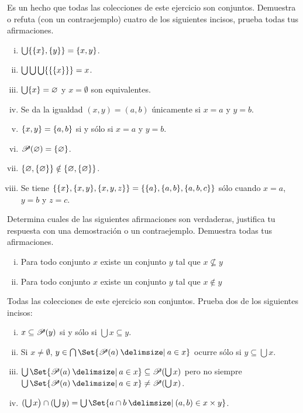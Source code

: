 \begin{exercise}
  Es un hecho que todas las colecciones de este ejercicio son conjuntos. Demuestra o refuta (con un contraejemplo) cuatro de los siguientes incisos, prueba todas tus afirmaciones.
  \begin{multicols}{2}
      \begin{enumerate}[i)]
          \item \( \bigcup \{\{x\},\{y\}\}=\{x,y\} \).
          \item \( \bigcup\bigcup\bigcup\{\{\{x\}\}\} = x \).
          \item \( \bigcup \{x\}=\varnothing \) y $x=\emptyset$ son equivalentes.
          \item Se da la igualdad \( (x,y)=(a,b) \) únicamente si \(x=a\) y \(y=b\).
          \item \( \{x,y\}=\{a,b\} \) si y sólo si $x=a$ y $y=b$.
          \item \( \mathscr{P}(\varnothing)=\{\varnothing\} \).
          \item \( \{\varnothing,\{\varnothing\}\} \notin \{\varnothing,\{\varnothing\}\} \).
          \item Se tiene \( \{\{x\},\{x,y\},\{x,y,z\}\} = \{\{a\},\{a,b\},\{a,b,c\}\} \) sólo cuando \(x=a\), \(y=b\) y \(z=c\).
          
      \end{enumerate}
  \end{multicols}
\end{exercise}

\begin{exercise}
  Determina cuales de las siguientes afirmaciones son verdaderas, justifica tu respuesta con una demostración o un contraejemplo. Demuestra todas tus afirmaciones.
  \begin{enumerate}[i)]
      \item Para todo conjunto \(x\) existe un conjunto \(y\) tal que \(x \not\subseteq y\)
      \item Para todo conjunto \(x\) existe un conjunto \(y\) tal que \(x \notin y\)
  \end{enumerate}
\end{exercise}

\begin{exercise}[tezfc=1]
  Todas las colecciones de este ejercicio son conjuntos. Prueba dos de los siguientes incisos:
  \begin{enumerate}[i)]
      \item \(x \subseteq \mathscr{P}(y)\) si y sólo si \(\bigcup x \subseteq y\).
      \item Si \(x \neq \emptyset\), \(y \in \bigcap\Set{\ms{P}(a) \st a \in x}\) ocurre sólo si \(y \subseteq \bigcup x\).
      \item \( \bigcup \Set{ \ms{P}(a) \st a \in x } \subseteq \ms{P}(\bigcup x) \) pero no siempre \( \bigcup \Set{ \ms{P}(a) \st a \in x } \neq \ms{P}(\bigcup x) \).
      \item \( ( \bigcup x \big) \cap ( \bigcup y ) = \bigcup \Set{ a \cap b \st (a,b) \in x \times y } \).
  \end{enumerate}
\end{exercise}

